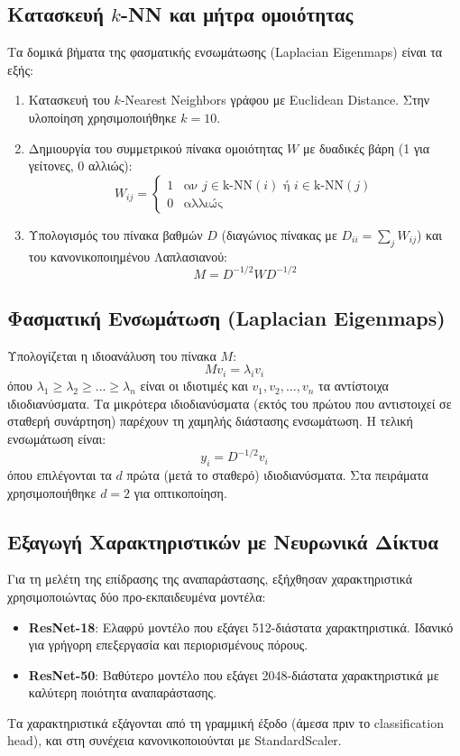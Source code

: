 \documentclass[a4paper,11pt]{article}
\newcommand{\lt}[1]{\foreignlanguage{english}{#1}}
\begin{document}
\subsection{Κατασκευή \lt{$k$-NN} και μήτρα ομοιότητας}
Τα δομικά βήματα της φασματικής ενσωμάτωσης (\lt{Laplacian Eigenmaps}) είναι τα εξής:
\begin{enumerate}
  \item Κατασκευή του \lt{$k$-Nearest Neighbors} γράφου με \lt{Euclidean Distance}. Στην υλοποίηση χρησιμοποιήθηκε $k=10$.
  \item Δημιουργία του συμμετρικού πίνακα ομοιότητας $W$ με δυαδικές βάρη (1 για γείτονες, 0 αλλιώς):
  \begin{equation}
  W_{ij} = \begin{cases} 1 & \text{αν } j \in \text{k-NN}(i) \text{ ή } i \in \text{k-NN}(j) \\ 0 & \text{αλλιώς} \end{cases}
  \end{equation}
  \item Υπολογισμός του πίνακα βαθμών $D$ (διαγώνιος πίνακας με $D_{ii} = \sum_j W_{ij}$) και του κανονικοποιημένου Λαπλασιανού:
  \begin{equation}
  M = D^{-1/2}WD^{-1/2}
  \end{equation}
\end{enumerate}

\subsection{Φασματική Ενσωμάτωση (Laplacian Eigenmaps)}
Υπολογίζεται η ιδιοανάλυση του πίνακα $M$:
\begin{equation}
M v_i = \lambda_i v_i
\end{equation}
όπου $\lambda_1 \geq \lambda_2 \geq \ldots \geq \lambda_n$ είναι οι ιδιοτιμές και $v_1, v_2, \ldots, v_n$ τα αντίστοιχα ιδιοδιανύσματα. Τα μικρότερα ιδιοδιανύσματα (εκτός του πρώτου που αντιστοιχεί σε σταθερή συνάρτηση) παρέχουν τη χαμηλής διάστασης ενσωμάτωση. Η τελική ενσωμάτωση είναι:
\begin{equation}
y_i = D^{-1/2} v_i
\end{equation}
όπου επιλέγονται τα $d$ πρώτα (μετά το σταθερό) ιδιοδιανύσματα. Στα πειράματα χρησιμοποιήθηκε $d=2$ για οπτικοποίηση.

\subsection{Εξαγωγή Χαρακτηριστικών με Νευρωνικά Δίκτυα}
Για τη μελέτη της επίδρασης της αναπαράστασης, εξήχθησαν χαρακτηριστικά χρησιμοποιώντας δύο προ-εκπαιδευμένα μοντέλα:
\begin{itemize}
  \item \textbf{\lt{ResNet-18}}: Ελαφρύ μοντέλο που εξάγει 512-διάστατα χαρακτηριστικά. Ιδανικό για γρήγορη επεξεργασία και περιορισμένους πόρους.
  \item \textbf{\lt{ResNet-50}}: Βαθύτερο μοντέλο που εξάγει 2048-διάστατα χαρακτηριστικά με καλύτερη ποιότητα αναπαράστασης.
\end{itemize}
Τα χαρακτηριστικά εξάγονται από τη γραμμική έξοδο (άμεσα πριν το \lt{classification head}), και στη συνέχεια κανονικοποιούνται με \lt{StandardScaler}.
\end{document}
